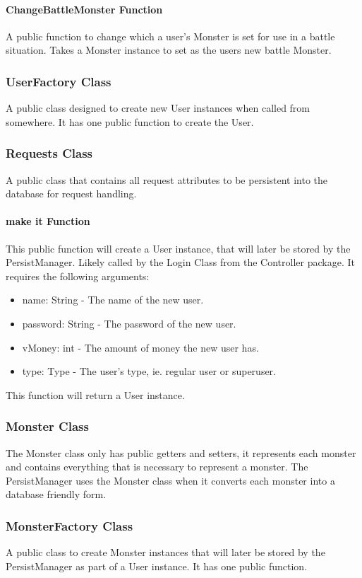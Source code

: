 \documentclass[titlepage]{article}
\begin{document}
\paragraph{ChangeBattleMonster Function}
A public function to change which a user's Monster is set for use in a battle situation. Takes a Monster instance to set as the users new battle Monster.

\subsubsection{UserFactory Class}
A public class designed to create new User instances when called from somewhere. It has one public function to create the User.

\subsubsection{Requests Class}
A public class that contains all request attributes to be persistent into the database for request handling.

\paragraph{make it Function}
This public function will create a User instance, that will later be stored by the PersistManager. Likely called by the Login Class from the Controller package. It requires the following arguments:
\begin{itemize}
\item{name: String - The name of the new user.}
\item{password: String - The password of the new user.}
\item{vMoney: int - The amount of money the new user has.}
\item{type: Type - The user's type, ie. regular user or superuser. }
\end{itemize}
This function will return a User instance.

\subsubsection{Monster Class}
The Monster class only has public getters and setters, it represents each monster and contains everything that is necessary to represent a monster. The PersistManager uses the Monster class when it converts each monster into a database friendly form.

\subsubsection{MonsterFactory Class}
A public class to create Monster instances that will later be stored by the PersistManager as part of a User instance. It has one public function.
\end{document}
